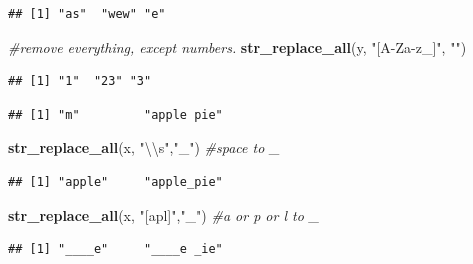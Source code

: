 \documentclass[]{book}
\newenvironment{Shaded}{\begin{snugshade}}{\end{snugshade}}
\newcommand{\KeywordTok}[1]{\textcolor[rgb]{0.13,0.29,0.53}{\textbf{#1}}}
\newcommand{\CharTok}[1]{\textcolor[rgb]{0.31,0.60,0.02}{#1}}
\newcommand{\StringTok}[1]{\textcolor[rgb]{0.31,0.60,0.02}{#1}}
\newcommand{\CommentTok}[1]{\textcolor[rgb]{0.56,0.35,0.01}{\textit{#1}}}
\newcommand{\NormalTok}[1]{#1}
\begin{document}
\begin{verbatim}
## [1] "as"  "wew" "e"
\end{verbatim}

\begin{Shaded}
\begin{Highlighting}[]
\CommentTok{#remove everything, except numbers. }
\KeywordTok{str_replace_all}\NormalTok{(y, }\StringTok{"[A-Za-z_]"}\NormalTok{, }\StringTok{""}\NormalTok{) }
\end{Highlighting}
\end{Shaded}

\begin{verbatim}
## [1] "1"  "23" "3"
\end{verbatim}

\begin{Shaded}
\end{Shaded}

\begin{verbatim}
## [1] "m"         "apple pie"
\end{verbatim}

\begin{Shaded}
\begin{Highlighting}[]
\KeywordTok{str_replace_all}\NormalTok{(x, }\StringTok{"}\CharTok{\textbackslash{}\textbackslash{}}\StringTok{s"}\NormalTok{,}\StringTok{"_"}\NormalTok{) }\CommentTok{#space to _}
\end{Highlighting}
\end{Shaded}

\begin{verbatim}
## [1] "apple"     "apple_pie"
\end{verbatim}

\begin{Shaded}
\begin{Highlighting}[]
\KeywordTok{str_replace_all}\NormalTok{(x, }\StringTok{"[apl]"}\NormalTok{,}\StringTok{"_"}\NormalTok{) }\CommentTok{#a or p or l to _}
\end{Highlighting}
\end{Shaded}

\begin{verbatim}
## [1] "____e"     "____e _ie"
\end{verbatim}
\end{document}
